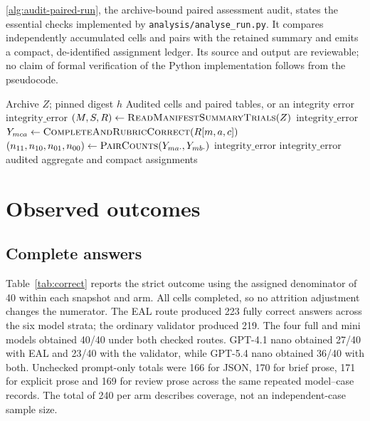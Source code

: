 \documentclass[11pt,a4paper]{article}
\newcommand{\code}[1]{\texttt{#1}}
\begin{document}
\autoref{alg:audit-paired-run}, the archive-bound paired assessment audit, states the essential checks implemented by \code{analysis/analyse\_run.py}. It compares independently accumulated cells and pairs with the retained summary and emits a compact, de-identified assignment ledger. Its source and output are reviewable; no claim of formal verification of the Python implementation follows from the pseudocode.
\begin{algorithm}[t]
\caption{Audit the fixed archive and compute finite-suite paired outcomes}\label{alg:audit-paired-run}
\begin{algorithmic}[1]
\Require Archive $Z$; pinned digest $h$
\Ensure Audited cells and paired tables, or an integrity error
  \State \Return $\mathrm{integrity\_error}$
\EndIf
\State $(M,S,R)\gets\Call{ReadManifestSummaryTrials}{Z}$
  \State \Return $\mathrm{integrity\_error}$
\EndIf
{}
  \State $Y_{mca}\gets\Call{CompleteAndRubricCorrect}{R[m,a,c]}$
\EndFor
{}
  \State $(n_{11},n_{10},n_{01},n_{00})\gets\Call{PairCounts}{Y_{ma\cdot},Y_{mb\cdot}}$
    \State \Return $\mathrm{integrity\_error}$
  \EndIf
\EndFor
{}
  \State \Return $\mathrm{integrity\_error}$
\EndIf
\State \Return audited aggregate and compact assignments
\end{algorithmic}
\end{algorithm}

\section{Observed outcomes}
\subsection{Complete answers}
Table~\ref{tab:correct} reports the strict outcome using the assigned denominator of 40 within each snapshot and arm. All cells completed, so no attrition adjustment changes the numerator. The EAL route produced 223 fully correct answers across the six model strata; the ordinary validator produced 219. The four full and mini models obtained 40/40 under both checked routes. GPT-4.1 nano obtained 27/40 with EAL and 23/40 with the validator, while GPT-5.4 nano obtained 36/40 with both. Unchecked prompt-only totals were 166 for JSON, 170 for brief prose, 171 for explicit prose and 169 for review prose across the same repeated model--case records. The total of 240 per arm describes coverage, not an independent-case sample size.
\end{document}
